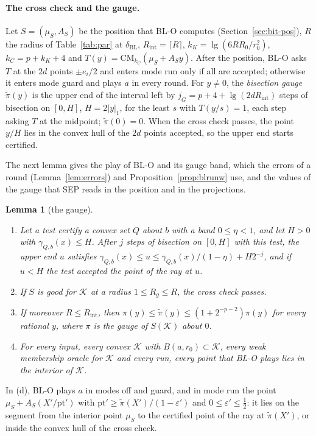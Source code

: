 \documentclass[11pt]{amsart}
\newtheorem{lemma}[theorem]{Lemma}
\theoremstyle{definition}
\numberwithin{equation}{section}
\newcommand{\cK}{\mathcal{K}}
\begin{document}
\paragraph{The cross check and the gauge.} Let $S=(\mu_S,A_S)$ be the position that BL-O computes (Section~\ref{sec:bit-pos}), $R$ the radius of Table~\ref{tab:par} at $\delta_{\mathrm{BL}}$, $R_{\mathrm{int}}=\lceil R\rceil$, $k_K=\lg(6RR_0/r_0^2)$, $k_C=p+k_K+4$ and $T(y)=\mathrm{CM}_{k_C}(\mu_S+A_Sy)$. After the position, BL-O asks $T$ at the $2d$ points $\pm e_i/2$ and enters mode run only if all are accepted; otherwise it enters mode guard and plays $a$ in every round. For $y\ne0$, the \emph{bisection gauge} $\tilde\pi(y)$ is the upper end of the interval left by $j_G=p+4+\lg(2dR_{\mathrm{int}})$ steps of bisection on $[0,H]$, $H=2|y|_1$, for the least $s$ with $T(y/s)=1$, each step asking $T$ at the midpoint; $\tilde\pi(0)=0$. When the cross check passes, the point $y/H$ lies in the convex hull of the $2d$ points accepted, so the upper end starts certified.

The next lemma gives the play of BL-O and its gauge band, which the errors of a round (Lemma~\ref{lem:errors}) and Proposition~\ref{prop:blrunw} use, and the values of the gauge that SEP reads in the position and in the projections.

\begin{lemma}[the gauge]\label{lem:gauge}
\begin{enumerate}[label=(\alph*)]
\item Let a test certify a convex set $Q$ about $b$ with a band $0\le\eta<1$, and let $H>0$ with $\gamma_{Q,b}(x)\le H$. After $j$ steps of bisection on $[0,H]$ with this test, the upper end $u$ satisfies $\gamma_{Q,b}(x)\le u\le\gamma_{Q,b}(x)/(1-\eta)+H2^{-j}$, and if $u<H$ the test accepted the point of the ray at $u$.
\item If $S$ is good for $\cK$ at a radius $1\le R_g\le R$, the cross check passes.
\item If moreover $R\le R_{\mathrm{int}}$, then $\pi(y)\le\tilde\pi(y)\le(1+2^{-p-2})\pi(y)$ for every rational $y$, where $\pi$ is the gauge of $S(\cK)$ about $0$.
\item For every input, every convex $\cK$ with $B(a,r_0)\subset\cK$, every weak membership oracle for $\cK$ and every run, every point that BL-O plays lies in the interior of $\cK$.
\end{enumerate}
\end{lemma}

In (d), BL-O plays $a$ in modes off and guard, and in mode run the point $\mu_S+A_S(X'/\mathrm{pt}')$ with $\mathrm{pt}'\ge\tilde\pi(X')/(1-\varepsilon')$ and $0\le\varepsilon'\le\frac12$: it lies on the segment from the interior point $\mu_S$ to the certified point of the ray at $\tilde\pi(X')$, or inside the convex hull of the cross check.
\end{document}
